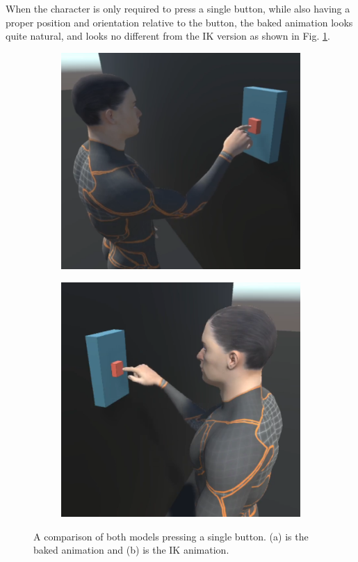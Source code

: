 When the character is only required to press a single button, while also having
a proper position and orientation relative to the button, the baked animation
looks quite natural, and looks no different from the IK version as shown in Fig.
\ref{fig:h_single}.

\begin{figure}[h!]
    \centering
    \captionsetup{justification=centering}
    \begin{subfigure}{0.4\textwidth}
        \includegraphics[width=\linewidth]{grafika/h_b_single.png}
    \end{subfigure}
    \begin{subfigure}{0.4\textwidth}
        \includegraphics[width=\linewidth]{grafika/h_ik_single.png}
    \end{subfigure}
    \caption{A comparison of both models pressing a single button. (a) is the
    baked animation and (b) is the IK animation.}
    \label{fig:h_single}
\end{figure}

